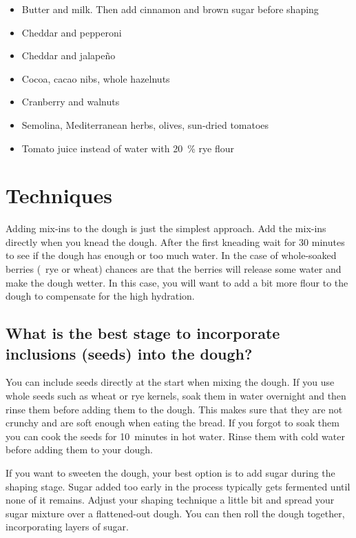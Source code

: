 \begin{itemize}
  \item Butter and milk. Then add cinnamon and brown sugar before shaping
  \item Cheddar and pepperoni
  \item Cheddar and jalapeño
  \item Cocoa, cacao nibs, whole hazelnuts
  \item Cranberry and walnuts
  \item Semolina, Mediterranean herbs, olives, sun-dried tomatoes
  \item Tomato juice instead of water with \qty{20}{\percent} rye flour
\end{itemize}

\section{Techniques}

Adding mix-ins to the dough is just the simplest approach. Add the mix-ins
directly when you knead the dough. After the first kneading wait for 30
minutes to see if the dough has enough or too much water. In the case of
whole-soaked berries (\eg~rye or wheat) chances are that the berries will
release some water and make the dough wetter. In this case, you will want to
add a bit more flour to the dough to compensate for the high hydration.

\subsection[Incorporating seeds into the dough]{What is the best stage to
incorporate inclusions (seeds) into the dough?}%
\label{subec:incorporate-seeds}

You can include seeds directly at the start when mixing the dough. If you use
whole seeds such as wheat or rye kernels, soak them in water overnight and
then rinse them before adding them to the dough. This makes sure that they are
not crunchy and are soft enough when eating the bread. If you forgot to soak
them you can cook the seeds for 10~minutes in hot water. Rinse them with cold
water before adding them to your dough.

If you want to sweeten the dough, your best option is to add sugar during the
shaping stage. Sugar added too early in the process typically gets fermented
until none of it remains. Adjust your shaping technique a little bit and
spread your sugar mixture over a flattened-out dough. You can then roll the
dough together, incorporating layers of sugar.

